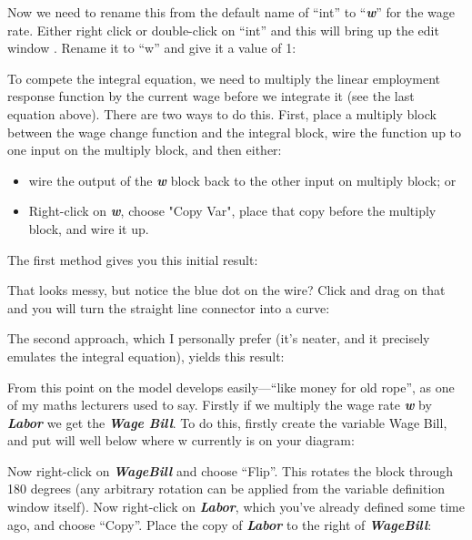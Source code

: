 Now we need to rename this from the default name of ``int'' to
``{\em\bf w}'' for the wage rate. Either right click or double-click
on ``int'' and this will bring up the edit window . Rename it to ``w'' and
give it a value of 1: 

\begin{center}
\end{center}

To compete the integral equation, we need to multiply the linear
employment response function by the current wage before we integrate
it (see the last equation above). There are two ways to do
this. First, place a multiply block between the wage change function
and the integral block, wire the function up to one input on the
multiply block, and then either:

\begin{itemize}
\item wire the output of the {\bf\em w} block back to the other input
on multiply block; or
\item Right-click on {\bf\em w}, choose "Copy Var", place that copy
before the multiply block, and wire it up.
\end{itemize}

The first method gives you this initial result:


That looks messy, but notice the blue dot on the wire? Click and drag
on that and you will turn the straight line connector into a curve: 


The second approach, which I personally prefer (it's neater, and it
precisely emulates the integral equation), yields this result: 


From this point on the model develops easily---``like money for old
rope'', as one of my maths lecturers used to say. Firstly if we
multiply the wage rate {\bf\em w} by {\bf\em Labor} we get the {\em\bf
Wage Bill}. To do this,
firstly create the variable Wage Bill, and put will well below where w
currently is on your diagram: 


Now right-click on {\bf\em WageBill} and choose ``Flip''. This rotates
the block through 180 degrees (any arbitrary rotation can be applied
from the variable definition window itself). Now right-click on
{\bf\em Labor}, which you've already defined some time ago, and choose
``Copy''. Place the copy of {\bf\em Labor} to the right of {\bf\em
WageBill}:

